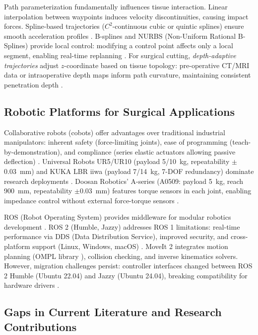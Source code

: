 \documentclass[journal]{IEEEtran}
\begin{document}
Path parameterization fundamentally influences tissue interaction. Linear interpolation between waypoints induces velocity discontinuities, causing impact forces. Spline-based trajectories ($C^2$-continuous cubic or quintic splines) ensure smooth acceleration profiles \cite{biagiotti2008trajectory}. B-splines and NURBS (Non-Uniform Rational B-Splines) provide local control: modifying a control point affects only a local segment, enabling real-time replanning \cite{piegl1997nurbs}. For surgical cutting, \textit{depth-adaptive trajectories} adjust $z$-coordinate based on tissue topology: pre-operative CT/MRI data or intraoperative depth maps inform path curvature, maintaining consistent penetration depth \cite{yang2020vision}.

\subsection{Robotic Platforms for Surgical Applications}

Collaborative robots (cobots) offer advantages over traditional industrial manipulators: inherent safety (force-limiting joints), ease of programming (teach-by-demonstration), and compliance (series elastic actuators allowing passive deflection) \cite{villani2018survey}. Universal Robots UR5/UR10 (payload 5/10~kg, repeatability $\pm$0.03~mm) and KUKA LBR iiwa (payload 7/14~kg, 7-DOF redundancy) dominate research deployments \cite{ur2023specifications, kuka2023iiwa}. Doosan Robotics' A-series (A0509: payload 5~kg, reach 900~mm, repeatability $\pm$0.03~mm) features torque sensors in each joint, enabling impedance control without external force-torque sensors \cite{doosan2023specs}.

ROS (Robot Operating System) provides middleware for modular robotics development \cite{quigley2009ros}. ROS 2 (Humble, Jazzy) addresses ROS 1 limitations: real-time performance via DDS (Data Distribution Service), improved security, and cross-platform support (Linux, Windows, macOS) \cite{macenski2022ros2}. MoveIt 2 \cite{chitta2012moveit} integrates motion planning (OMPL library \cite{sucan2012open}), collision checking, and inverse kinematics solvers. However, migration challenges persist: controller interfaces changed between ROS 2 Humble (Ubuntu 22.04) and Jazzy (Ubuntu 24.04), breaking compatibility for hardware drivers \cite{moveit2023migration}.

\subsection{Gaps in Current Literature and Research Contributions}
\end{document}
